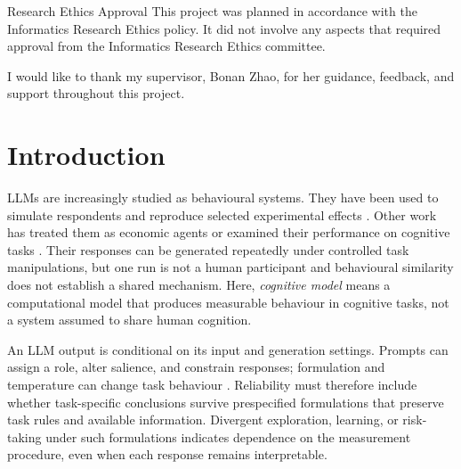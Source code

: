 \documentclass[logo,msc,inf]{infthesis}       %
\begin{document}
\begin{preliminary}
\maketitle

\newenvironment{ethics}
   {\begin{frontenv}{Research Ethics Approval}{\LARGE}}
   {\end{frontenv}\newpage}

\begin{ethics}
This project was planned in accordance with the Informatics Research
Ethics policy. It did not involve any aspects that required approval
from the Informatics Research Ethics committee.

\standarddeclaration
\end{ethics}


\begin{acknowledgements}
I would like to thank my supervisor, Bonan Zhao, for her guidance, feedback,
and support throughout this project.
\end{acknowledgements}


\tableofcontents
\end{preliminary}


\chapter{Introduction}

LLMs are increasingly studied as behavioural systems. They have been used to simulate respondents and reproduce selected experimental effects \cite{Argyle2023OutOfOneMany,Aher2023SimulateHumans}. Other work has treated them as economic agents \cite{Horton2023HomoSilicus} or examined their performance on cognitive tasks \cite{Binz2023CognitivePsychologyGPT3,Hagendorff2023HumanLikeBiases}. Their responses can be generated repeatedly under controlled task manipulations, but one run is not a human participant and behavioural similarity does not establish a shared mechanism. Here, \emph{cognitive model} means a computational model that produces measurable behaviour in cognitive tasks, not a system assumed to share human cognition.

An LLM output is conditional on its input and generation settings. Prompts can assign a role, alter salience, and constrain responses; formulation and temperature can change task behaviour \cite{Loya2023PromptSensitivityDecision}. Reliability must therefore include whether task-specific conclusions survive prespecified formulations that preserve task rules and available information. Divergent exploration, learning, or risk-taking under such formulations indicates dependence on the measurement procedure, even when each response remains interpretable.
\end{document}
